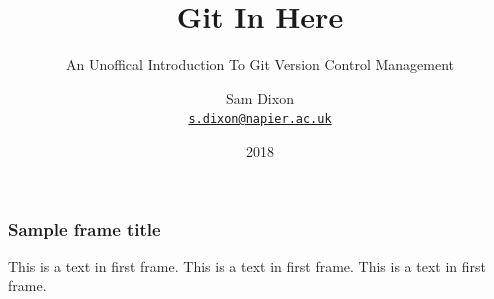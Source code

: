 \documentclass{beamer}
\title{Git In Here}
\subtitle{An Unoffical Introduction To Git Version Control Management}
\author{Sam Dixon\\
{\tt \href{mailto:s.dixon@napier.ac.uk}{s.dixon@napier.ac.uk}}}
\date{2018}
\begin{document}
\frame{\titlepage}
  
\begin{frame}
\frametitle{Sample frame title}
  This is a text in first frame. This is a text in first frame. This is a text
  in first frame.
\end{frame}
\end{document}

